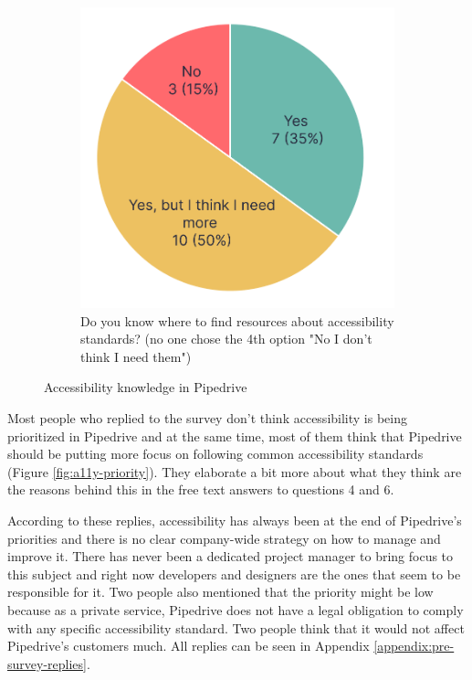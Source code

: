 \documentclass{master_thesis}
\begin{document}
\begin{figure}[H]
\begin{subfigure}{0.4\textwidth}
		\includegraphics[width=\textwidth]{img/a11y-resources.png}
		\caption{Do you know where to find resources
		about accessibility standards? (no one chose the 4th option "No I don't think I need them") }
    	\label{fig:a11y-resources}
	\end{subfigure}
	\caption{Accessibility knowledge in Pipedrive}
    \label{fig:a11y-knowledge}
\end{figure}

Most people who replied to the survey don't think accessibility is being prioritized in Pipedrive and at the same time, most of them think that Pipedrive should be putting more focus on following common accessibility standards (Figure \ref{fig:a11y-priority}). They elaborate a bit more about what they think are the reasons behind this in the free text answers to questions 4 and 6.

According to these replies, accessibility has always been at the end of Pipedrive's priorities and there is no clear company-wide strategy on how to manage and improve it. There has never been a dedicated project manager to bring focus to this subject
and right now developers and designers are the ones that seem to be responsible for it. Two people also mentioned that the priority might be low because as a private service, Pipedrive does not have a legal obligation to comply with any specific accessibility standard. Two people think that it would not affect Pipedrive's customers much. All replies can be seen in  Appendix \ref{appendix:pre-survey-replies}.
\end{document}
